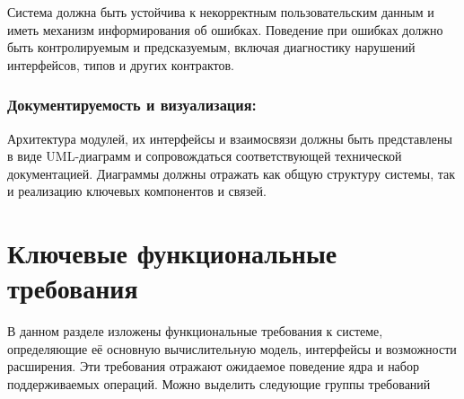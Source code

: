 Система должна быть устойчива к некорректным пользовательским данным и иметь механизм информирования об ошибках. Поведение при ошибках должно быть контролируемым и предсказуемым, включая диагностику нарушений интерфейсов, типов и других контрактов.

\subsubsection{Документируемость и визуализация:}
Архитектура модулей, их интерфейсы и взаимосвязи должны быть представлены в виде UML-диаграмм и сопровождаться соответствующей технической документацией. Диаграммы должны отражать как общую структуру системы, так и реализацию ключевых компонентов и связей.


\section{Ключевые функциональные требования}
В данном разделе изложены функциональные требования к системе, определяющие её основную вычислительную модель, интерфейсы и возможности расширения. Эти требования отражают ожидаемое поведение ядра и набор поддерживаемых операций. Можно выделить следующие группы требований

